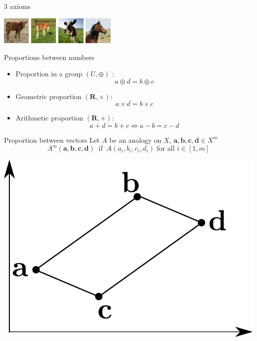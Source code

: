 \documentclass{beamer}
\begin{document}
\begin{frame}{3 axioms}
\begin{enumerate}
    \begin{center}
      \includegraphics[width=0.1\textwidth]{figures/calf.jpg}
      \includegraphics[width=0.1\textwidth]{figures/foal.jpg}
      \includegraphics[width=0.1\textwidth]{figures/cow.jpg}
      \includegraphics[width=0.1\textwidth]{figures/horse.jpg}
    \end{center}
  \end{enumerate}
\end{frame}

\begin{frame}{Proportions between numbers}
  \begin{itemize}
    \item Proportion in a group $(U, \oplus)$ \cite{StrYvoREPORT05}:
      $$a \oplus d = b \oplus c$$
    \item Geometric proportion $(\mathbf{R}, \times)$:
      $$a \times d = b\times c$$
    \item Arithmetic proportion $(\mathbf{R}, +)$:
      $$a + d = b + c \iff a - b = c - d$$
  \end{itemize}
\end{frame}

\begin{frame}{Proportion between vectors}
  Let $A$ be an analogy on $X$, $\mathbf{a}, \mathbf{b}, \mathbf{c}, \mathbf{d}
  \in X^m$
  $$A^m(\mathbf{a}, \mathbf{b}, \mathbf{c}, \mathbf{d}) ~ \text{  if  } ~
  A(a_i, b_i, c_i, d_i) \text{ for all } i \in [1, m]$$

  \begin{center}
    \includegraphics[width=.3\textwidth]{figures/arithmetic_proportion.pdf}
  \end{center}
\end{frame}
\end{document}
